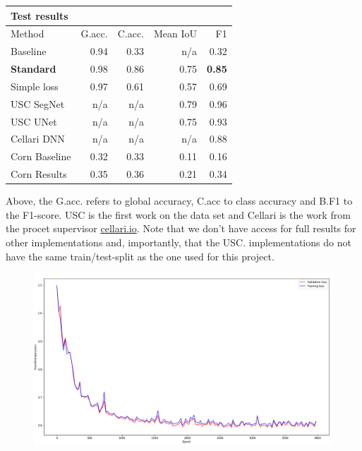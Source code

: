 \documentclass{article}
\begin{document}
\begin{table}[!htb]
	\centering
	\begin{tabular}{l r r r r}
		\textbf{Test results} & & & & \\
		\toprule
		Method  &  G.acc.  &  C.acc.  &  Mean IoU  &  F1 \\ \midrule
		Baseline  &  0.94  &  0.33  &  n/a  &  0.32 \\
		\textbf{Standard}  &  0.98  &  0.86  &  0.75  & \textbf{ 0.85} \\
		Simple loss  &  0.97  &  0.61  &  0.57  &  0.69 \\
		\midrule
		USC SegNet  &  n/a  &  n/a  &  0.79  &  0.96 \\
		USC UNet  &  n/a  &  n/a  &  0.75  &  0.93 \\
		Cellari DNN  &  n/a  &  n/a  &  n/a  &  0.88 \\
		\midrule 
		Corn Baseline  &  0.32  &  0.33  &  0.11  &  0.16 \\
		Corn Results  &  0.35  &  0.36  &  0.21  &  0.34 \\
		\bottomrule
	\end{tabular}
\end{table}
\noindent Above, the G.acc. refers to global accuracy, C.acc to class accuracy and B.F1 to the F1-score.
USC is the first work on the data set \cite{brazil} and Cellari is the work from the procet supervisor \url{cellari.io}.
Note that we don't have access for full results for other implementations and, importantly, that the USC. implementations do not have the same train/test-split as the one used for this project.
\begin{figure}[!htb]
	\centering
	\includegraphics[width=0.9\linewidth]{../../poster/loss}
	\caption{}
	\label{fig:loss}
\end{figure}


\end{document}
